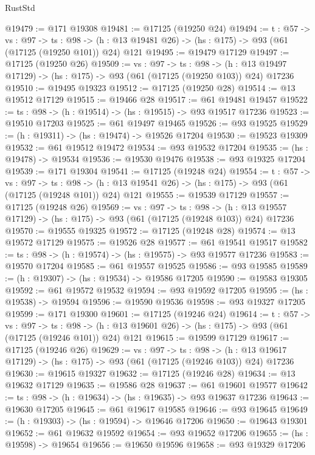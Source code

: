 \begin{lexlean}{RustStd}
\begin{coremodule}
@19479 := @171 @19308
@19481 := @17125 (@19250 @24)
@19494 := {t : @57} ->
  {vs : @97} ->
  {ts : @98} -> (h : @13 @19481 @26) -> (hs : @175) -> @93 (@61 (@17125 (@19250 @101)) @24) @121
@19495 := @19479 @17129
@19497 := @17125 (@19250 @26)
@19509 := {vs : @97} ->
  {ts : @98} ->
  (h : @13 @19497 @17129) -> (hs : @175) -> @93 (@61 (@17125 (@19250 @103)) @24) @17236
@19510 := @19495 @19323
@19512 := @17125 (@19250 @28)
@19514 := @13 @19512 @17129
@19515 := @19466 @28
@19517 := @61 @19481 @19457
@19522 := {ts : @98} -> (h : @19514) -> (hs : @19515) -> @93 @19517 @17236
@19523 := @19510 @17203
@19525 := @61 @19497 @19465
@19526 := @93 @19525
@19529 := (h : @19311) -> (hs : @19474) -> @19526 @17204
@19530 := @19523 @19309
@19532 := @61 @19512 @19472
@19534 := @93 @19532 @17204
@19535 := (hs : @19478) -> @19534
@19536 := @19530 @19476
@19538 := @93 @19325 @17204
@19539 := @171 @19304
@19541 := @17125 (@19248 @24)
@19554 := {t : @57} ->
  {vs : @97} ->
  {ts : @98} -> (h : @13 @19541 @26) -> (hs : @175) -> @93 (@61 (@17125 (@19248 @101)) @24) @121
@19555 := @19539 @17129
@19557 := @17125 (@19248 @26)
@19569 := {vs : @97} ->
  {ts : @98} ->
  (h : @13 @19557 @17129) -> (hs : @175) -> @93 (@61 (@17125 (@19248 @103)) @24) @17236
@19570 := @19555 @19325
@19572 := @17125 (@19248 @28)
@19574 := @13 @19572 @17129
@19575 := @19526 @28
@19577 := @61 @19541 @19517
@19582 := {ts : @98} -> (h : @19574) -> (hs : @19575) -> @93 @19577 @17236
@19583 := @19570 @17204
@19585 := @61 @19557 @19525
@19586 := @93 @19585
@19589 := (h : @19307) -> (hs : @19534) -> @19586 @17205
@19590 := @19583 @19305
@19592 := @61 @19572 @19532
@19594 := @93 @19592 @17205
@19595 := (hs : @19538) -> @19594
@19596 := @19590 @19536
@19598 := @93 @19327 @17205
@19599 := @171 @19300
@19601 := @17125 (@19246 @24)
@19614 := {t : @57} ->
  {vs : @97} ->
  {ts : @98} -> (h : @13 @19601 @26) -> (hs : @175) -> @93 (@61 (@17125 (@19246 @101)) @24) @121
@19615 := @19599 @17129
@19617 := @17125 (@19246 @26)
@19629 := {vs : @97} ->
  {ts : @98} ->
  (h : @13 @19617 @17129) -> (hs : @175) -> @93 (@61 (@17125 (@19246 @103)) @24) @17236
@19630 := @19615 @19327
@19632 := @17125 (@19246 @28)
@19634 := @13 @19632 @17129
@19635 := @19586 @28
@19637 := @61 @19601 @19577
@19642 := {ts : @98} -> (h : @19634) -> (hs : @19635) -> @93 @19637 @17236
@19643 := @19630 @17205
@19645 := @61 @19617 @19585
@19646 := @93 @19645
@19649 := (h : @19303) -> (hs : @19594) -> @19646 @17206
@19650 := @19643 @19301
@19652 := @61 @19632 @19592
@19654 := @93 @19652 @17206
@19655 := (hs : @19598) -> @19654
@19656 := @19650 @19596
@19658 := @93 @19329 @17206

\end{coremodule}
\end{lexlean}
